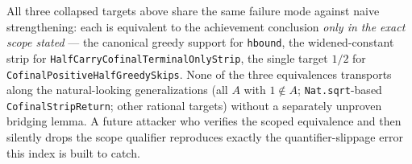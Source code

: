 \begin{rem}
All three collapsed targets above share the same failure mode against naive strengthening: each
is equivalent to the achievement conclusion \emph{only in the exact scope stated} — the
canonical greedy support for \texttt{hbound}, the widened-constant strip for
\texttt{HalfCarryCofinalTerminalOnlyStrip}, the single target $1/2$ for
\texttt{CofinalPositiveHalfGreedySkips}. None of the three equivalences transports along the
natural-looking generalizations (all $A$ with $1\notin A$; \texttt{Nat.sqrt}-based
\texttt{CofinalStripReturn}; other rational targets) without a separately unproven bridging
lemma. A future attacker who verifies the scoped equivalence and then silently drops the scope
qualifier reproduces exactly the quantifier-slippage error this index is built to catch.
\end{rem}
